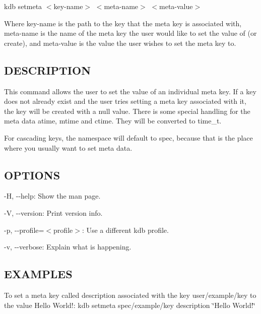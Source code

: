 {\ttfamily kdb setmeta $<$key-\/name$>$ $<$meta-\/name$>$ $<$meta-\/value$>$}

Where {\ttfamily key-\/name} is the path to the key that the meta key is associated with, {\ttfamily meta-\/name} is the name of the meta key the user would like to set the value of (or create), and {\ttfamily meta-\/value} is the value the user wishes to set the meta key to.

\subsection*{D\+E\+S\+C\+R\+I\+P\+T\+I\+O\+N}

This command allows the user to set the value of an individual meta key. If a key does not already exist and the user tries setting a meta key associated with it, the key will be created with a null value. There is some special handling for the meta data atime, mtime and ctime. They will be converted to time\+\_\+t.

For cascading keys, the namespace will default to {\ttfamily spec}, because that is the place where you usually want to set meta data.

\subsection*{O\+P\+T\+I\+O\+N\+S}


\begin{DoxyItemize}
\item {\ttfamily -\/\+H}, {\ttfamily -\/-\/help}\+: Show the man page.
\item {\ttfamily -\/\+V}, {\ttfamily -\/-\/version}\+: Print version info.
\item {\ttfamily -\/p}, {\ttfamily -\/-\/profile}=$<$profile$>$\+: Use a different kdb profile.
\item {\ttfamily -\/v}, {\ttfamily -\/-\/verbose}\+: Explain what is happening.
\end{DoxyItemize}

\subsection*{E\+X\+A\+M\+P\+L\+E\+S}

To set a meta key called {\ttfamily description} associated with the key {\ttfamily user/example/key} to the value {\ttfamily Hello World!}\+: {\ttfamily kdb setmeta spec/example/key description \char`\"{}\+Hello World!\char`\"{}}

